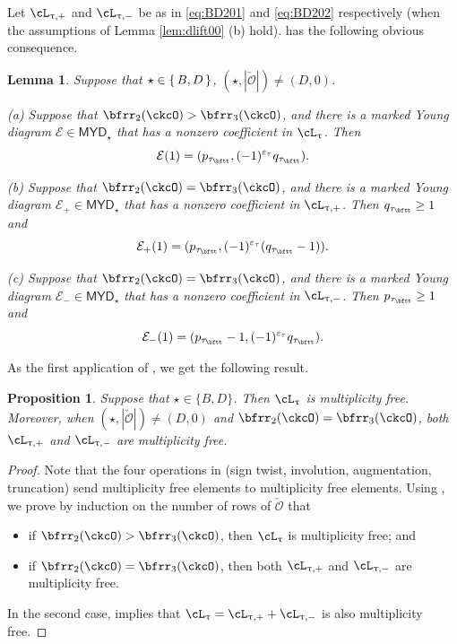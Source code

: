 \documentclass[11pt,a4paper]{amsart}
\def\MYD{{\mathsf{MYD}}}
\def\abs#1{\left|{#1}\right|}
\newcommand{\CE}{{\mathcal {E}}}
\newcommand{\CO}{{\mathcal {O}}}
\numberwithin{equation}{section}
\newtheorem{lem}[thm]{Lemma}
\newtheorem{prop}[thm]{Proposition}
\theoremstyle{remark}
\def\MYD{{\mathsf{MYD}}}
\def\ac{\cL}
\begin{document}
  Let $\ac_{\uptau,+}$ and $\ac_{\uptau,-}$ be as in \eqref{eq:BD201} and \eqref{eq:BD202} respectively (when the assumptions of
  Lemma \ref{lem:dlift00} (b) hold).  has the following obvious consequence.
  \begin{lem}\label{taile0}
  Suppose that $\star \in \set{B,D}$, $(\star, \abs{\check \CO})\neq (D, 0)$.

   \noindent (a) Suppose that $\bfrr_{2}(\ckcO)>\bfrr_{3}(\ckcO)$, and there is a marked Young diagram   $\CE\in \MYD_\star$ that has a nonzero coefficient in $\ac_\uptau$. Then
   \[
     \CE(1)=(p_{\tau_\bftt}, (-1)^{\varepsilon_\tau} q_{\tau_\bftt}).
   \]

   \noindent (b) Suppose that $\bfrr_{2}(\ckcO)=\bfrr_{3}(\ckcO)$, and there is a marked Young diagram   $\CE_+\in \MYD_\star$ that has a nonzero coefficient in $\ac_{\uptau,+}$. Then  $q_{\tau_\bftt}\geq 1$ and
   \[
     \CE_+(1)=( p_{\tau_\bftt}, (-1)^{\varepsilon_\tau}(q_{\tau_\bftt}-1)).
   \]

   \noindent (c) Suppose that $\bfrr_{2}(\ckcO)=\bfrr_{3}(\ckcO)$, and there is a marked Young diagram   $\CE_-\in \MYD_\star$ that has a nonzero coefficient in $\ac_{\uptau,-}$. Then  $p_{\tau_\bftt}\geq 1$ and
   \[
     \CE_-(1)=( p_{\tau_\bftt}-1, (-1)^{\varepsilon_\tau} q_{\tau_\bftt}).
   \]
  \end{lem}

 As the first application of  , we get the following result.

  \begin{prop}\label{lem:dlift001}
 Suppose that $\star\in\{B,D\}$. Then $\ac_\uptau$ is multiplicity free. Moreover, when  $(\star, \abs{\check \CO})\neq(D,0)$ and $\bfrr_{2}(\ckcO)=\bfrr_{3}(\ckcO)$, both $\ac_{\uptau,+}$ and  $\ac_{\uptau,-}$ are multiplicity free.
 \end{prop}
 \begin{proof}
 Note that the four operations in  (sign twist, involution, augmentation, truncation) send multiplicity free elements to multiplicity free elements. Using , we prove by induction on the number of rows of $\check \CO$ that
 \begin{itemize}
     \item if $\bfrr_{2}(\ckcO)>\bfrr_{3}(\ckcO)$, then $\ac_\uptau$ is multiplicity free; and
     \item
     if $\bfrr_{2}(\ckcO)=\bfrr_{3}(\ckcO)$, then both $\ac_{\uptau,+}$ and  $\ac_{\uptau,-}$ are multiplicity free.
 \end{itemize}
 In the second case,  implies that $\ac_\uptau=\ac_{\uptau,+}+\ac_{\uptau,-}$ is also multiplicity free.
 \end{proof}
\end{document}
